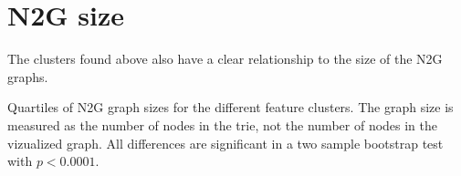 \section{N2G size}
The clusters found above also have a clear relationship to the size of the \ac{N2G} graphs.

\begin{table}[ht]
    \centering
    
    \caption{Quartiles of \ac{N2G} graph sizes for the different feature clusters. The graph size is measured as the number of nodes in the trie, not the number of nodes in the vizualized graph.
    All differences are significant in a two sample bootstrap test with $p<0.0001$.
    }
    \label{tab:n2g_sizes}
\end{table}